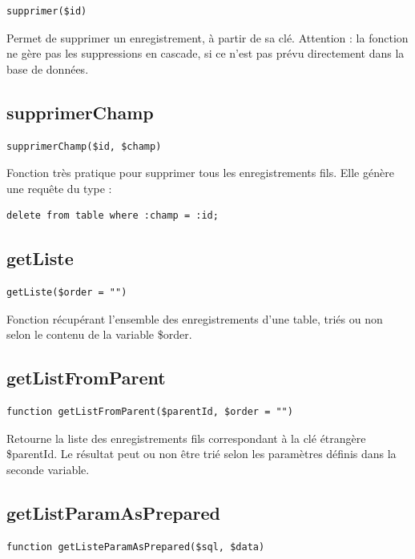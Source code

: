 \begin{lstlisting}
supprimer($id)
\end{lstlisting}

Permet de supprimer un enregistrement, à partir de sa clé. Attention : la fonction ne gère pas les suppressions en cascade, si ce n'est pas prévu directement dans la base de données.

\subsection{supprimerChamp}

\begin{lstlisting}
supprimerChamp($id, $champ)
\end{lstlisting}

Fonction très pratique pour supprimer tous les enregistrements fils. Elle génère une requête du type :
\begin{lstlisting}
delete from table where :champ = :id;
\end{lstlisting}


\subsection{getListe}

\begin{lstlisting}
getListe($order = "")
\end{lstlisting}

Fonction récupérant l'ensemble des enregistrements d'une table, triés ou non selon le contenu de la variable \$order.

\subsection{getListFromParent}

\begin{lstlisting}
function getListFromParent($parentId, $order = "")
\end{lstlisting}

Retourne la liste des enregistrements fils correspondant à la clé étrangère \$parentId. Le résultat peut ou non être trié selon les paramètres définis dans la seconde variable.

\subsection{getListParamAsPrepared}

\begin{lstlisting}
function getListeParamAsPrepared($sql, $data)
\end{lstlisting}

